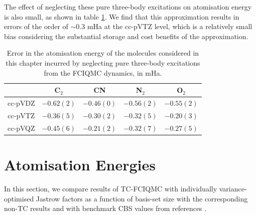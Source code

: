 The effect of neglecting these pure three-body excitations on atomisation energy is also small, as shown in table \ref{table:no3_Eat_error}. We find that this approximation results in errors of the order of
$\sim0.3$ mHa at the cc-pVTZ level, which is a relatively small bias
considering the substantial storage and cost benefits of the
approximation.

\begin{table}[htbp]
    \centering
    \begin{tabular}{cllll}
                              &
    \multicolumn{1}{c}{C$_2$} &
    \multicolumn{1}{c}{CN   } &
    \multicolumn{1}{c}{N$_2$} &
    \multicolumn{1}{c}{O$_2$} \\
    \hline \hline
    cc-pVDZ   & $-0.62(2)$ & $-0.46(0)$ & $-0.56(2)$ & $-0.55(2)$ \\
    cc-pVTZ   & $-0.36(5)$ & $-0.30(2)$ & $-0.32(5)$ & $-0.20(3)$ \\
    cc-pVQZ   & $-0.45(6)$ & $-0.21(2)$ & $-0.32(7)$ & $-0.27(5)$ \\
    \hline
    \end{tabular}
    \caption{
      Error in the atomisation energy of the molecules considered in this
      chapter incurred by neglecting pure three-body excitations from the
      FCIQMC dynamics, in mHa.
      \label{table:no3_Eat_error}}
  \end{table}

\section{Atomisation Energies}

In this section, we compare results of TC-FCIQMC with individually variance-optimised Jastrow factors as a function of basis-set size with the corresponding non-TC results and with benchmark \gls{CBS} values from references \parencite{fellerSurvey2008,bytautasCorrelation2005,hardingHighaccuracy2008}.

